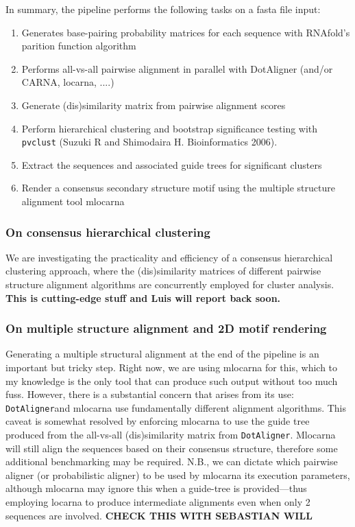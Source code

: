 \documentclass[a4paper,twoside]{article}
\newcommand\dotaligner{\texttt{DotAligner}}
\newcommand\pvclust{\texttt{pvclust}}
\begin{document}
In summary, the pipeline performs the following tasks on a fasta file input:
\begin{enumerate}
\item Generates base-pairing probability matrices for each sequence with RNAfold's parition function algorithm 
\item Performs all-vs-all pairwise alignment in parallel with DotAligner (and/or CARNA, locarna, ....)
\item Generate (dis)similarity matrix from pairwise alignment scores 
\item Perform hierarchical clustering and bootstrap significance testing with \pvclust{} (Suzuki R and Shimodaira H. Bioinformatics 2006).
\item Extract the sequences and associated guide trees for significant clusters
\item Render a consensus secondary structure motif using the multiple structure alignment tool mlocarna
\end{enumerate}

\subsubsection{ On consensus hierarchical clustering }
We are investigating the practicality and efficiency of a consensus hierarchical clustering approach, 
where the (dis)similarity matrices of different pairwise structure alignment algorithms are concurrently 
employed for cluster analysis. \textbf{This is cutting-edge stuff and Luis will report back soon. }

\subsubsection{ On multiple structure alignment and 2D motif rendering }
Generating a multiple structural alignment at the end of the pipeline is an important but tricky step. 
Right now, we are using mlocarna for this, which to my knowledge is the only tool that can produce such output
without too much fuss. However, there is a substantial concern that arises from its use: \dotaligner and mlocarna
use fundamentally different alignment algorithms. This caveat is somewhat resolved by enforcing mlocarna to use 
the guide tree produced from the all-vs-all (dis)similarity matrix from \dotaligner . Mlocarna will still align
the sequences based on their consensus structure, therefore some additional benchmarking may be required. N.B., 
we can dictate which pairwise aligner (or probabilistic aligner) to be used by mlocarna its execution parameters,
although mlocarna may ignore this when a guide-tree is provided---thus employing locarna to produce intermediate
alignments even when only 2 sequences are involved. \textbf{CHECK THIS WITH SEBASTIAN WILL }
\end{document}
